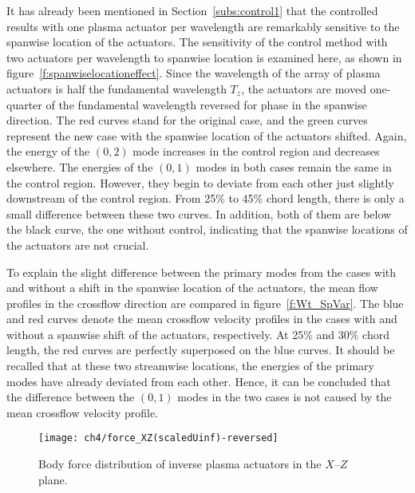 It has already been mentioned in Section~\ref{subs:control1} that the controlled results with one plasma actuator per wavelength are remarkably sensitive to the spanwise location of the actuators. The sensitivity of the control method with two actuators per wavelength to  spanwise location is examined here, as shown in figure~\ref{f:spanwiselocationeffect}. Since the wavelength of the array of plasma actuators is half  the fundamental wavelength $T_z$, the actuators are moved one-quarter of the fundamental wavelength reversed for phase in the spanwise direction. The red curves stand for the original case, and the green curves represent the new case with the  spanwise location of the actuators shifted. Again, the energy of the $(0,2)$ mode increases in the control region and decreases elsewhere. The energies of  the $(0,1)$ modes in both cases remain the same in the control region. However, they begin to deviate from each other just slightly downstream of the control region. From 25\% to 45\% chord length, there is only a small difference between these two curves. In addition, both of them are below the black curve, the one without control, indicating that the spanwise locations of the actuators are not crucial.

To explain the slight difference between the primary modes from the cases with and without a shift in the spanwise location of the actuators, the mean flow profiles in the crossflow direction are compared in figure~\ref{f:Wt_SpVar}. The blue  and  red curves denote the mean crossflow velocity profiles in the cases with and without a spanwise shift of the  actuators, respectively. At 25\% and 30\% chord length, the red curves are perfectly superposed on the blue curves. It should be recalled that at these two streamwise locations, the energies of the primary modes have already deviated from each other. Hence, it can be concluded that the difference between the $(0,1)$ modes in the two cases is not caused by the mean crossflow velocity profile.
\begin{figure}
\centering
\texttt{[image: ch4/force\_XZ(scaledUinf)-reversed]}
\caption{Body force distribution of inverse plasma actuators in the $X$--$Z$ plane.}%
\label{f:force_reversed}
\end{figure}

